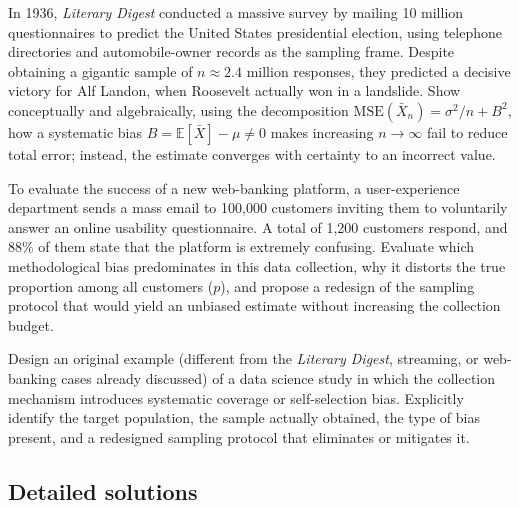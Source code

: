 \begin{problema}
	\label{prob:a5bddfb}
	In 1936, \emph{Literary Digest} conducted a massive survey by mailing 10 million questionnaires to predict the United States presidential election, using telephone directories and automobile-owner records as the sampling frame. Despite obtaining a gigantic sample of $n \approx 2.4$ million responses, they predicted a decisive victory for Alf Landon, when Roosevelt actually won in a landslide. Show conceptually and algebraically, using the decomposition $\text{MSE}(\bar{X}_n) = \sigma^2/n + B^2$, how a systematic bias $B = \mathbb{E}[\bar{X}] - \mu \neq 0$ makes increasing $n \to \infty$ fail to reduce total error; instead, the estimate converges with certainty to an incorrect value.
\end{problema}

\begin{problema}
	\label{prob:feeec4c}
	To evaluate the success of a new web-banking platform, a user-experience department sends a mass email to 100,000 customers inviting them to voluntarily answer an online usability questionnaire. A total of 1,200 customers respond, and $88\%$ of them state that the platform is extremely confusing. Evaluate which methodological bias predominates in this data collection, why it distorts the true proportion among all customers ($p$), and propose a redesign of the sampling protocol that would yield an unbiased estimate without increasing the collection budget.
\end{problema}

\begin{problema}
	\label{prob:701b535}
	Design an original example (different from the \emph{Literary Digest}, streaming, or web-banking cases already discussed) of a data science study in which the collection mechanism introduces systematic coverage or self-selection bias. Explicitly identify the target population, the sample actually obtained, the type of bias present, and a redesigned sampling protocol that eliminates or mitigates it.
\end{problema}

\subsection*{Detailed solutions}

